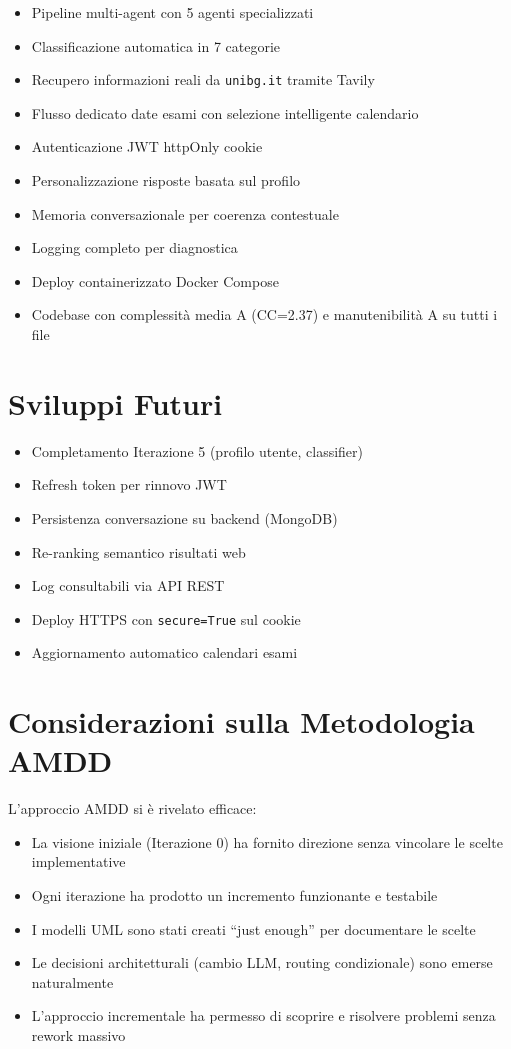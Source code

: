 \documentclass[a4paper,12pt]{report}
\begin{document}
\begin{itemize}
    \item Pipeline multi-agent con 5 agenti specializzati
    \item Classificazione automatica in 7 categorie
    \item Recupero informazioni reali da \texttt{unibg.it} tramite Tavily
    \item Flusso dedicato date esami con selezione intelligente calendario
    \item Autenticazione JWT httpOnly cookie
    \item Personalizzazione risposte basata sul profilo
    \item Memoria conversazionale per coerenza contestuale
    \item Logging completo per diagnostica
    \item Deploy containerizzato Docker Compose
    \item Codebase con complessità media A (CC=2.37) e manutenibilità A su tutti i file
\end{itemize}

\section{Sviluppi Futuri}

\begin{itemize}
    \item Completamento Iterazione 5 (profilo utente, classifier)
    \item Refresh token per rinnovo JWT
    \item Persistenza conversazione su backend (MongoDB)
    \item Re-ranking semantico risultati web
    \item Log consultabili via API REST
    \item Deploy HTTPS con \texttt{secure=True} sul cookie
    \item Aggiornamento automatico calendari esami
\end{itemize}

\section{Considerazioni sulla Metodologia AMDD}

L'approccio AMDD si è rivelato efficace:
\begin{itemize}
    \item La visione iniziale (Iterazione 0) ha fornito direzione senza vincolare le scelte implementative
    \item Ogni iterazione ha prodotto un incremento funzionante e testabile
    \item I modelli UML sono stati creati ``just enough'' per documentare le scelte
    \item Le decisioni architetturali (cambio LLM, routing condizionale) sono emerse naturalmente
    \item L'approccio incrementale ha permesso di scoprire e risolvere problemi senza rework massivo
\end{itemize}
\end{document}
